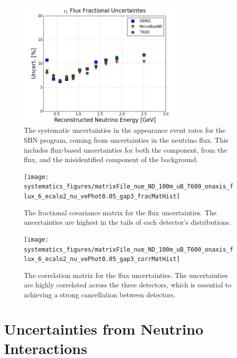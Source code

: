 \begin{figure}[]
    \centering
    \includegraphics[width=0.75\textwidth]{systematics_figures/matrixFile_nue_ND_100m_uB_T600_onaxis_flux_6_ecalo2_nu_vePhot0.05_gap3_fracUncert}
    \caption[Fractional Flux Uncertainties]{The systematic uncertainties in the \nue appearance event rates for the SBN program, coming from uncertainties in the neutrino flux.  This includes flux-based uncertainties for both the \nue component, from the \nue flux, and the \numu misidentified component of the background.}
   \label{fig:sys_flux_uncert_fracUncert}
\end{figure}

\begin{figure}[]
    \centering
    \texttt{[image: systematics\_figures/matrixFile\_nue\_ND\_100m\_uB\_T600\_onaxis\_flux\_6\_ecalo2\_nu\_vePhot0.05\_gap3\_fracMatHist]}
    \caption[Flux Fractional Covariance Matrix]{The fractional covariance matrix for the flux uncertainties.  The uncertainties are highest in the tails of each detector's distributions.}
   \label{fig:syst_flux_fracmatrix}
\end{figure}
\begin{figure}[]
    \centering
    \texttt{[image: systematics\_figures/matrixFile\_nue\_ND\_100m\_uB\_T600\_onaxis\_flux\_6\_ecalo2\_nu\_vePhot0.05\_gap3\_corrMatHist]}
    \caption[Flux Correlation Matrix]{The correlation matrix for the flux uncertainties. The uncertainties are highly correlated across the three detectors, which is essential to achieving a strong cancellation between detectors. }
   \label{fig:syst_flux_corrmatrix}
\end{figure}



\section{Uncertainties from Neutrino Interactions}

